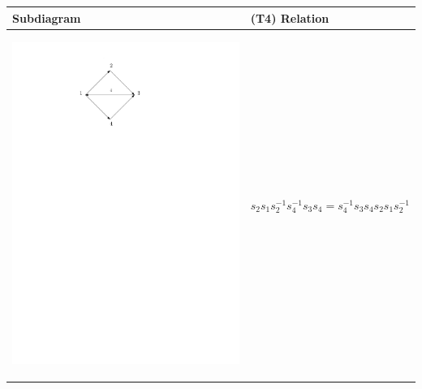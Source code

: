 \documentclass[11pt]{amsart}
\theoremstyle{definition}
\begin{document}
\begin{table}[h] 
\begin{tabular}{| p{3.5cm} | p{7cm} |}
\hline
Subdiagram & (T4) Relation \\ \hline
\begin{center}\includegraphics[scale = .30]{Diagram1.pdf}\end{center} & $s_{2}s_{1}s_{2}^{-1}s_{4}^{-1}s_{3}s_{4} = s_{4}^{-1}s_{3}s_{4}s_{2}s_{1}s_{2}^{-1}$ \\ \hline


\end{tabular}
\end{table}
\end{document}
